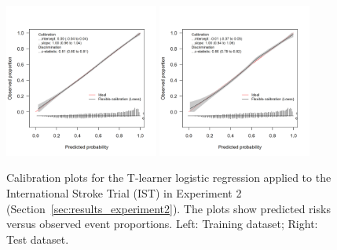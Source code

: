 
\begin{figure}[htbp]
\centering
\includegraphics[width=0.45\textwidth]{img/results_IST/glm_tlearner_train_calibration_plot.png}
\includegraphics[width=0.45\textwidth]{img/results_IST/glm_tlearner_test_calibration_plot.png}
\caption{Calibration plots for the T-learner logistic regression applied to the International Stroke Trial (IST) in Experiment 2 (Section~\ref{sec:results_experiment2}). The plots show predicted risks versus observed event proportions. Left: Training dataset; Right: Test dataset.}
\label{fig:calibration_IST_glm}
\end{figure}


